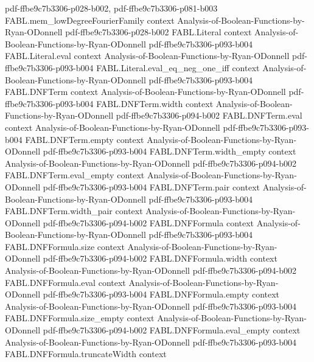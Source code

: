 \begin{theorem}
  {pdf-ffbe9c7b3306-p028-b002,
    pdf-ffbe9c7b3306-p081-b003}
\proofstep
  {FABL.mem_lowDegreeFourierFamily}
  {context}
  {Analysis-of-Boolean-Functions-by-Ryan-ODonnell}
  {pdf-ffbe9c7b3306-p028-b002}
\proofstep
  {FABL.Literal}
  {context}
  {Analysis-of-Boolean-Functions-by-Ryan-ODonnell}
  {pdf-ffbe9c7b3306-p093-b004}
\proofstep
  {FABL.Literal.eval}
  {context}
  {Analysis-of-Boolean-Functions-by-Ryan-ODonnell}
  {pdf-ffbe9c7b3306-p093-b004}
\proofstep
  {FABL.Literal.eval_eq_neg_one_iff}
  {context}
  {Analysis-of-Boolean-Functions-by-Ryan-ODonnell}
  {pdf-ffbe9c7b3306-p093-b004}
\proofstep
  {FABL.DNFTerm}
  {context}
  {Analysis-of-Boolean-Functions-by-Ryan-ODonnell}
  {pdf-ffbe9c7b3306-p093-b004}
\proofstep
  {FABL.DNFTerm.width}
  {context}
  {Analysis-of-Boolean-Functions-by-Ryan-ODonnell}
  {pdf-ffbe9c7b3306-p094-b002}
\proofstep
  {FABL.DNFTerm.eval}
  {context}
  {Analysis-of-Boolean-Functions-by-Ryan-ODonnell}
  {pdf-ffbe9c7b3306-p093-b004}
\proofstep
  {FABL.DNFTerm.empty}
  {context}
  {Analysis-of-Boolean-Functions-by-Ryan-ODonnell}
  {pdf-ffbe9c7b3306-p093-b004}
\proofstep
  {FABL.DNFTerm.width_empty}
  {context}
  {Analysis-of-Boolean-Functions-by-Ryan-ODonnell}
  {pdf-ffbe9c7b3306-p094-b002}
\proofstep
  {FABL.DNFTerm.eval_empty}
  {context}
  {Analysis-of-Boolean-Functions-by-Ryan-ODonnell}
  {pdf-ffbe9c7b3306-p093-b004}
\proofstep
  {FABL.DNFTerm.pair}
  {context}
  {Analysis-of-Boolean-Functions-by-Ryan-ODonnell}
  {pdf-ffbe9c7b3306-p093-b004}
\proofstep
  {FABL.DNFTerm.width_pair}
  {context}
  {Analysis-of-Boolean-Functions-by-Ryan-ODonnell}
  {pdf-ffbe9c7b3306-p094-b002}
\proofstep
  {FABL.DNFFormula}
  {context}
  {Analysis-of-Boolean-Functions-by-Ryan-ODonnell}
  {pdf-ffbe9c7b3306-p093-b004}
\proofstep
  {FABL.DNFFormula.size}
  {context}
  {Analysis-of-Boolean-Functions-by-Ryan-ODonnell}
  {pdf-ffbe9c7b3306-p094-b002}
\proofstep
  {FABL.DNFFormula.width}
  {context}
  {Analysis-of-Boolean-Functions-by-Ryan-ODonnell}
  {pdf-ffbe9c7b3306-p094-b002}
\proofstep
  {FABL.DNFFormula.eval}
  {context}
  {Analysis-of-Boolean-Functions-by-Ryan-ODonnell}
  {pdf-ffbe9c7b3306-p093-b004}
\proofstep
  {FABL.DNFFormula.empty}
  {context}
  {Analysis-of-Boolean-Functions-by-Ryan-ODonnell}
  {pdf-ffbe9c7b3306-p093-b004}
\proofstep
  {FABL.DNFFormula.size_empty}
  {context}
  {Analysis-of-Boolean-Functions-by-Ryan-ODonnell}
  {pdf-ffbe9c7b3306-p094-b002}
\proofstep
  {FABL.DNFFormula.eval_empty}
  {context}
  {Analysis-of-Boolean-Functions-by-Ryan-ODonnell}
  {pdf-ffbe9c7b3306-p093-b004}
\proofstep
  {FABL.DNFFormula.truncateWidth}
  {context}

\end{theorem}
